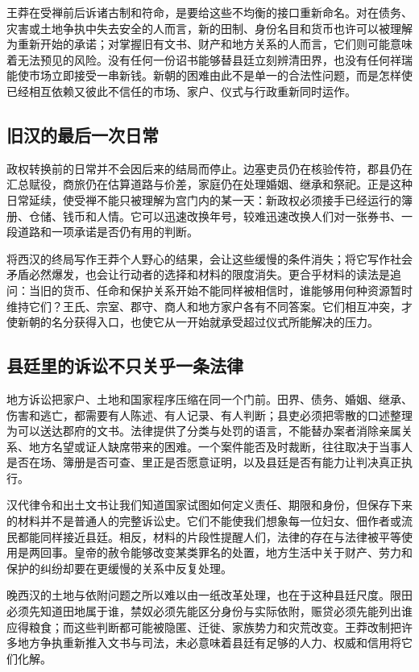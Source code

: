 王莽在受禅前后诉诸古制和符命，是要给这些不均衡的接口重新命名。对在债务、灾害或土地争执中失去安全的人而言，新的田制、身份名目和货币也许可以被理解为重新开始的承诺；对掌握旧有文书、财产和地方关系的人而言，它们则可能意味着无法预见的风险。没有任何一份诏书能够替县廷立刻辨清田界，也没有任何祥瑞能使市场立即接受一串新钱。新朝的困难由此不是单一的合法性问题，而是怎样使已经相互依赖又彼此不信任的市场、家户、仪式与行政重新同时运作。

\subsection{旧汉的最后一次日常}

政权转换前的日常并不会因后来的结局而停止。边塞吏员仍在核验传符，郡县仍在汇总赋役，商旅仍在估算道路与价差，家庭仍在处理婚姻、继承和祭祀。正是这种日常延续，使受禅不能只被理解为宫门内的某一天：新政权必须接手已经运行的簿册、仓储、钱币和人情。它可以迅速改换年号，较难迅速改换人们对一张券书、一段道路和一项承诺是否仍有用的判断。

将西汉的终局写作王莽个人野心的结果，会让这些缓慢的条件消失；将它写作社会矛盾必然爆发，也会让行动者的选择和材料的限度消失。更合乎材料的读法是追问：当旧的货币、任命和保护关系开始不能同样被相信时，谁能够用何种资源暂时维持它们？王氏、宗室、郡守、商人和地方家户各有不同答案。它们相互冲突，才使新朝的名分获得入口，也使它从一开始就承受超过仪式所能解决的压力。

\subsection{县廷里的诉讼不只关乎一条法律}

地方诉讼把家户、土地和国家程序压缩在同一个门前。田界、债务、婚姻、继承、伤害和逃亡，都需要有人陈述、有人记录、有人判断；县吏必须把零散的口述整理为可以送达郡府的文书。法律提供了分类与处罚的语言，不能替办案者消除亲属关系、地方名望或证人缺席带来的困难。一个案件能否及时裁断，往往取决于当事人是否在场、簿册是否可查、里正是否愿意证明，以及县廷是否有能力让判决真正执行。

汉代律令和出土文书让我们知道国家试图如何定义责任、期限和身份，但保存下来的材料并不是普通人的完整诉讼史。它们不能使我们想象每一位妇女、佃作者或流民都能同样接近县廷。相反，材料的片段性提醒人们，法律的存在与法律被平等使用是两回事。皇帝的赦令能够改变某类罪名的处置，地方生活中关于财产、劳力和保护的纠纷却要在更缓慢的关系中反复处理。

晚西汉的土地与依附问题之所以难以由一纸改革处理，也在于这种县廷尺度。限田必须先知道田地属于谁，禁奴必须先能区分身份与实际依附，赈贷必须先能列出谁应得粮食；而这些判断都可能被隐匿、迁徙、家族势力和灾荒改变。王莽改制把许多地方争执重新推入文书与司法，未必意味着县廷有足够的人力、权威和信用将它们化解。

